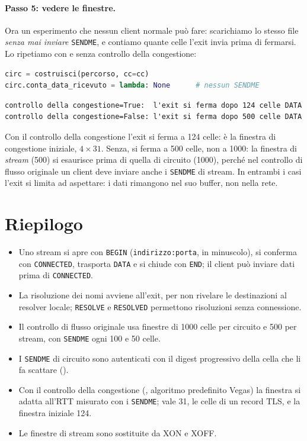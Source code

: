 \paragraph{Passo 5: vedere le finestre.} Ora un esperimento che nessun client normale può fare: scarichiamo lo stesso file \emph{senza mai inviare} \texttt{SENDME}, e contiamo quante celle l'exit invia prima di fermarsi. Lo ripetiamo con e senza controllo della congestione:
\begin{lstlisting}[language=Python]
circ = costruisci(percorso, cc=cc)
circ.conta_data_ricevuto = lambda: None      # nessun SENDME
\end{lstlisting}
\begin{lstlisting}[numbers=none]
controllo della congestione=True:  l'exit si ferma dopo 124 celle DATA
controllo della congestione=False: l'exit si ferma dopo 500 celle DATA
\end{lstlisting}
Con il controllo della congestione l'exit si ferma a 124 celle: è la finestra di congestione iniziale, $4 \times 31$. Senza, si ferma a 500 celle, non a 1000: la finestra di \emph{stream} (500) si esaurisce prima di quella di circuito (1000), perché nel controllo di flusso originale un client deve inviare anche i \texttt{SENDME} di stream. In entrambi i casi l'exit si limita ad aspettare: i dati rimangono nel suo buffer, non nella rete.

\section*{Riepilogo}
\begin{itemize}
  \item Uno stream si apre con \texttt{BEGIN} (\texttt{indirizzo:porta}, in minuscolo), si conferma con \texttt{CONNECTED}, trasporta \texttt{DATA} e si chiude con \texttt{END}; il client può inviare dati prima di \texttt{CONNECTED}.
  \item La risoluzione dei nomi avviene all'exit, per non rivelare le destinazioni al resolver locale; \texttt{RESOLVE} e \texttt{RESOLVED} permettono risoluzioni senza connessione.
  \item Il controllo di flusso originale usa finestre di 1000 celle per circuito e 500 per stream, con \texttt{SENDME} ogni 100 e 50 celle.
  \item I \texttt{SENDME} di circuito sono autenticati con il digest progressivo della cella che li fa scattare ().
  \item Con il controllo della congestione (, algoritmo predefinito Vegas) la finestra si adatta all'RTT misurato con i \texttt{SENDME};  vale 31, le celle di un record TLS, e la finestra iniziale 124.
  \item Le finestre di stream sono sostituite da XON e XOFF.
\end{itemize}


